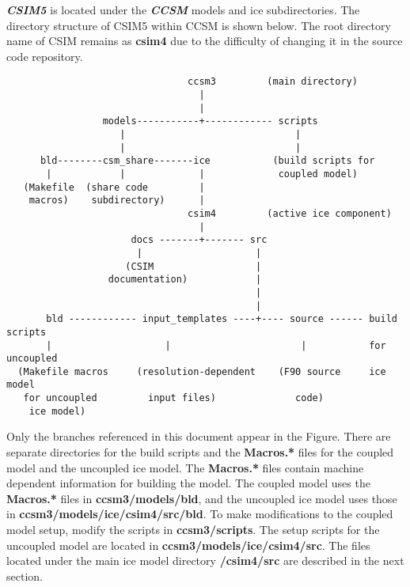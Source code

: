 \documentclass[]{article}
\begin{document}
{\bf \textsl{CSIM5}} is located under the {\bf \textsl{CCSM}} models and ice subdirectories.
The directory structure of CSIM5 within CCSM is shown below.  The root directory name of CSIM
remains as {\bf csim4} due to the difficulty of changing it in the source code repository.

\begin{verbatim}
                                ccsm3         (main directory) 
                                  |
                                  |
                 models-----------+------------ scripts
                    |                              |
                    |                              |
      bld--------csm_share-------ice           (build scripts for
       |            |             |             coupled model)
   (Makefile  (share code         |               
    macros)    subdirectory)      | 
                                csim4         (active ice component)
                                  |
                      docs -------+------- src 
                       |                    | 
                     (CSIM                  |
                  documentation)            |
                                            |
                                            |
       bld ------------ input_templates ----+---- source ------ build scripts
       |                    |                       |           for uncoupled
  (Makefile macros     (resolution-dependent    (F90 source     ice model
   for uncoupled         input files)              code) 
    ice model)
\end{verbatim}

Only the branches referenced in this document appear in the Figure. There
are separate directories for the build scripts and the {\bf Macros.*} files for
the coupled model and the uncoupled ice model. The {\bf Macros.*} files
contain machine dependent information for building the model.  The coupled
model uses the {\bf Macros.*} files in {\bf ccsm3/models/bld}, and the
uncoupled ice model uses those in {\bf ccsm3/models/ice/csim4/src/bld}.
To make modifications to the coupled model setup, modify the scripts in 
{\bf ccsm3/scripts}.  The setup scripts for the uncoupled model are
located in {\bf ccsm3/models/ice/csim4/src}.  The files located under
the main ice model directory {\bf /csim4/src} are described in the next section.


\end{document}
